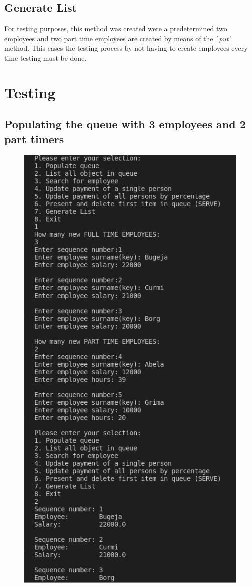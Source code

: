 \documentclass[12pt]{article}
\begin{document}
\subsection{Generate List}
For testing purposes, this method was created were a predetermined two employees and two part time employees are created by means of the ´\emph{put}´ method. This eases the testing process by not having to create employees every time testing must be done.

\newpage
\section{Testing}
\subsection{Populating the queue with 3 employees and 2 part timers}
\begin{figure}[h]
\centering
\includegraphics[scale=0.30]{Images/Testing 1/1.png}
\end{figure}
\end{document}
